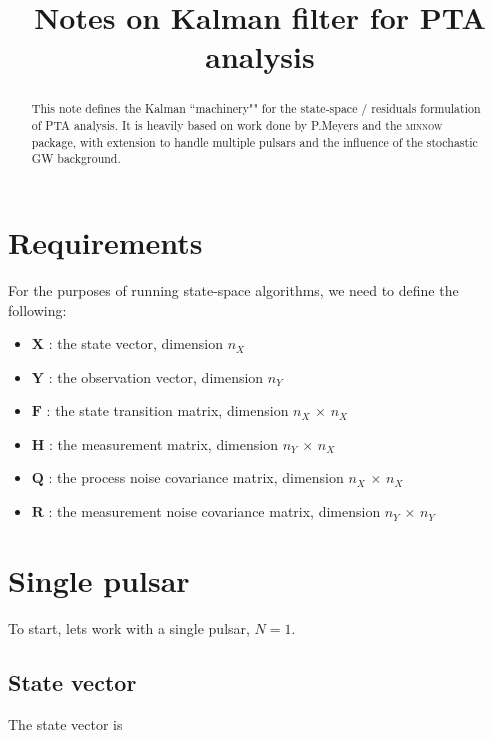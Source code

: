 \documentclass[]{scrartcl}
\title{Notes on Kalman filter for PTA analysis}
\author{}
\begin{document}
\maketitle

\begin{abstract}
This note defines the Kalman ``machinery"" for the state-space / residuals formulation of PTA analysis. It is heavily based on work done by P.Meyers and the \textsc{minnow} package, with extension to handle multiple pulsars and the influence of the stochastic GW background. 
\end{abstract}

\section{Requirements}

For the purposes of running state-space algorithms, we need to define the following:

\begin{itemize}
\item $\boldsymbol{X}$ : the state vector, dimension $n_X$
\item  $\boldsymbol{Y}$ : the observation vector, dimension $n_Y$
\item $\boldsymbol{F}$ : the state transition matrix, dimension $n_X$ $\times$ $n_X$
\item  $\boldsymbol{H}$ : the measurement matrix, dimension $n_Y$ $\times$ $n_X$
\item $\boldsymbol{Q}$ : the process noise covariance matrix, dimension $n_X$ $\times$ $n_X$
\item $\boldsymbol{R}$ : the measurement noise covariance matrix, dimension $n_Y$ $\times$ $n_Y$
\end{itemize}








\section{Single pulsar}\label{sec:single_pulsar}
To start, lets work with a single pulsar, $N=1$. \newline 


\subsection{State vector}

\noindent The state vector is 
\end{document}
